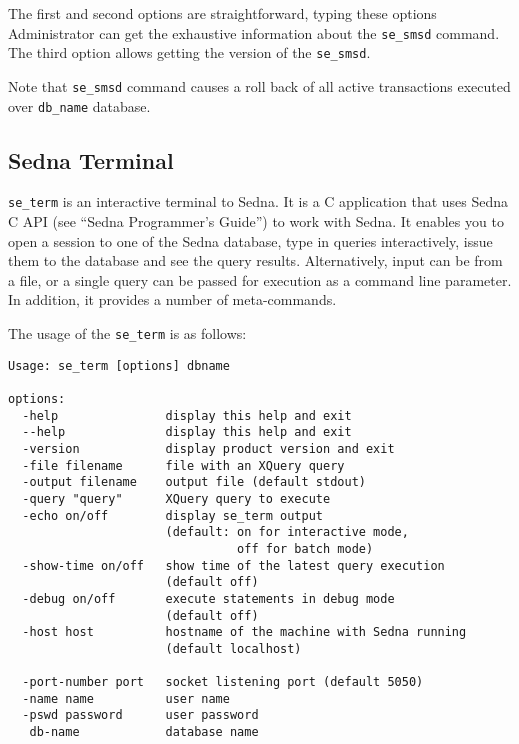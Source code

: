 \documentclass[a4paper,12pt]{article}
\begin{document}
The first and second options are straightforward, typing these options
Administrator can get the exhaustive information about the \verb!se_smsd!
command. The third option allows getting the version of the \verb!se_smsd!.

Note that \verb!se_smsd! command causes a roll back of all active transactions
executed over \verb!db_name! database.


\subsection{Sedna Terminal}
\label{terminal}

\verb!se_term! is an interactive terminal to Sedna. It is a C application that
uses Sedna C API (see ``Sedna Programmer's Guide'') to work with Sedna. It
enables you to open a session to one of the Sedna database, type in queries
interactively, issue them to the database and see the query results.
Alternatively, input can be from a file, or a single query can be passed for
execution as a command line parameter. In addition, it provides a number of
meta-commands.

The usage of the \verb!se_term! is as follows:

\small{
\begin{verbatim}
Usage: se_term [options] dbname

options:
  -help               display this help and exit
  --help              display this help and exit
  -version            display product version and exit
  -file filename      file with an XQuery query
  -output filename    output file (default stdout)
  -query "query"      XQuery query to execute
  -echo on/off        display se_term output
                      (default: on for interactive mode,
                                off for batch mode)
  -show-time on/off   show time of the latest query execution
                      (default off)
  -debug on/off       execute statements in debug mode
                      (default off)
  -host host          hostname of the machine with Sedna running
                      (default localhost)

  -port-number port   socket listening port (default 5050)
  -name name          user name
  -pswd password      user password
   db-name            database name
\end{verbatim}}
\end{document}
